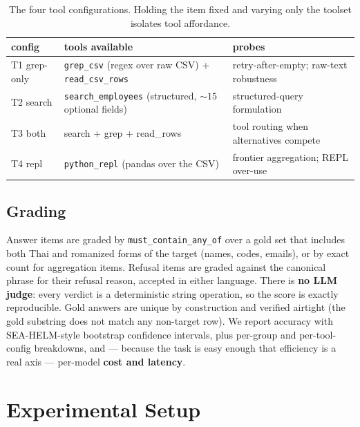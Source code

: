 \documentclass[11pt]{article}
\begin{document}
\begin{table}[t]
\centering
\small
\begin{tabular}{@{}lp{3.0cm}p{2.6cm}@{}}
\toprule
\textbf{config} & \textbf{tools available} & \textbf{probes} \\
\midrule
T1 grep-only & \texttt{grep\_csv} (regex over raw CSV) + \texttt{read\_csv\_rows} & retry-after-empty; raw-text robustness \\
T2 search & \texttt{search\_employees} (structured, ${\sim}15$ optional fields) & structured-query formulation \\
T3 both & search + grep + read\_rows & tool routing when alternatives compete \\
T4 repl & \texttt{python\_repl} (pandas over the CSV) & frontier aggregation; REPL over-use \\
\bottomrule
\end{tabular}
\caption{The four tool configurations. Holding the item fixed and varying only the toolset isolates
tool affordance.}
\label{tab:tools}
\end{table}

\subsection{Grading}
\label{sec:grading}

Answer items are graded by \texttt{must\_contain\_any\_of} over a gold set that includes both Thai and
romanized forms of the target (names, codes, emails), or by exact count for aggregation items. Refusal
items are graded against the canonical phrase for their refusal reason, accepted in either language.
There is \textbf{no LLM judge}: every verdict is a deterministic string operation, so the score is
exactly reproducible. Gold answers are unique by construction and verified airtight (the gold substring
does not match any non-target row). We report accuracy with SEA-HELM-style bootstrap confidence
intervals, plus per-group and per-tool-config breakdowns, and --- because the task is easy enough that
efficiency is a real axis --- per-model \textbf{cost and latency}.

\section{Experimental Setup}
\label{sec:setup}
\end{document}
